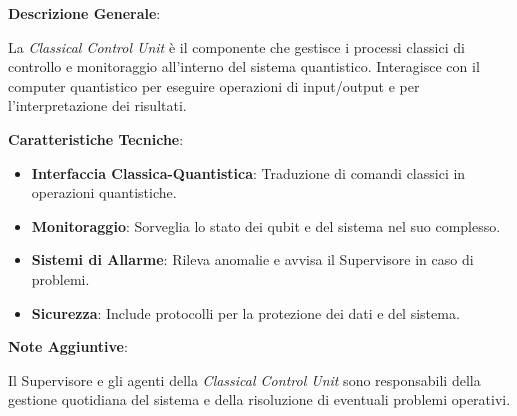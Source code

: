 \begin{tcolorbox}[colback=white,colframe=black,title=\textbf{Classical Control Unit}]
\begin{multicols}{2}
\textbf{Descrizione Generale}:

La \emph{Classical Control Unit} è il componente che gestisce i processi classici di controllo e monitoraggio all'interno del sistema quantistico. Interagisce con il computer quantistico per eseguire operazioni di input/output e per l'interpretazione dei risultati.

\textbf{Caratteristiche Tecniche}:
\begin{itemize}
    \item \textbf{Interfaccia Classica-Quantistica}: Traduzione di comandi classici in operazioni quantistiche.
    \item \textbf{Monitoraggio}: Sorveglia lo stato dei qubit e del sistema nel suo complesso.
    \item \textbf{Sistemi di Allarme}: Rileva anomalie e avvisa il Supervisore in caso di problemi.
    \item \textbf{Sicurezza}: Include protocolli per la protezione dei dati e del sistema.
\end{itemize}

\textbf{Note Aggiuntive}:

Il Supervisore e gli agenti della \emph{Classical Control Unit} sono responsabili della gestione quotidiana del sistema e della risoluzione di eventuali problemi operativi.

\end{multicols}
\end{tcolorbox}

\vspace{0.5cm}

